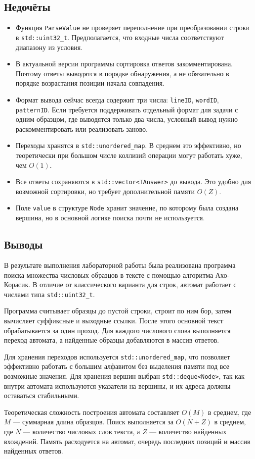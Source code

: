 \documentclass[12pt]{article}
\begin{document}
\subsection*{Недочёты}

\begin{itemize}
    \item Функция \texttt{ParseValue} не проверяет переполнение при преобразовании строки в \texttt{std::uint32\_t}. Предполагается, что входные числа соответствуют диапазону из условия.
    \item В актуальной версии программы сортировка ответов закомментирована. Поэтому ответы выводятся в порядке обнаружения, а не обязательно в порядке возрастания позиции начала совпадения.
    \item Формат вывода сейчас всегда содержит три числа: \texttt{lineID}, \texttt{wordID}, \texttt{patternID}. Если требуется поддерживать отдельный формат для задачи с одним образцом, где выводятся только два числа, условный вывод нужно раскомментировать или реализовать заново.
    \item Переходы хранятся в \texttt{std::unordered\_map}. В среднем это эффективно, но теоретически при большом числе коллизий операции могут работать хуже, чем $O(1)$.
    \item Все ответы сохраняются в \texttt{std::vector<TAnswer>} до вывода. Это удобно для возможной сортировки, но требует дополнительной памяти $O(Z)$.
    \item Поле \texttt{value} в структуре \texttt{Node} хранит значение, по которому была создана вершина, но в основной логике поиска почти не используется.
\end{itemize}

\subsection*{Выводы}
\hspace{2ex}
В результате выполнения лабораторной работы была реализована программа поиска множества числовых образцов в тексте с помощью алгоритма Ахо-Корасик. В отличие от классического варианта для строк, автомат работает с числами типа \texttt{std::uint32\_t}.

Программа считывает образцы до пустой строки, строит по ним бор, затем вычисляет суффиксные и выходные ссылки. После этого основной текст обрабатывается за один проход. Для каждого числового слова выполняется переход автомата, а найденные образцы добавляются в массив ответов.

Для хранения переходов используется \texttt{std::unordered\_map}, что позволяет эффективно работать с большим алфавитом без выделения памяти под все возможные значения. Для хранения вершин выбран \texttt{std::deque<Node>}, так как внутри автомата используются указатели на вершины, и их адреса должны оставаться стабильными.

Теоретическая сложность построения автомата составляет $O(M)$ в среднем, где $M$ --- суммарная длина образцов. Поиск выполняется за $O(N + Z)$ в среднем, где $N$ --- количество числовых слов текста, а $Z$ --- количество найденных вхождений. Память расходуется на автомат, очередь последних позиций и массив найденных ответов.
\end{document}
